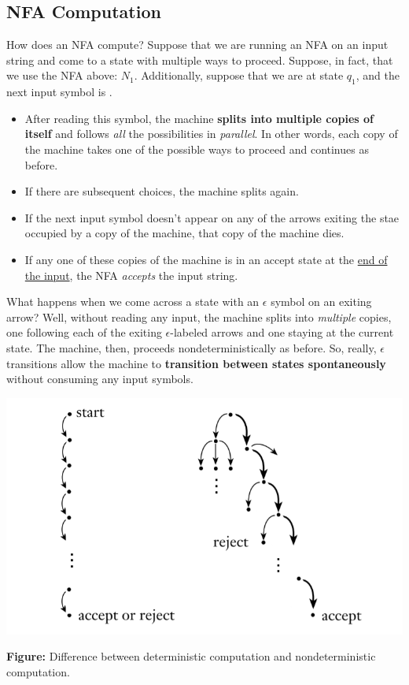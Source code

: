 \documentclass[letterpaper]{article}
\begin{document}
\subsection{NFA Computation}
How does an NFA compute? Suppose that we are running an NFA on an input string and come to a state with multiple ways to proceed. Suppose, in fact, that we use the NFA above: $N_1$. Additionally, suppose that we are at state $q_1$, and the next input symbol is . 
\begin{itemize}
    \item After reading this symbol, the machine \textbf{splits into multiple copies of itself} and follows \emph{all} the possibilities in \emph{parallel}. In other words, each copy of the machine takes one of the possible ways to proceed and continues as before. 
    \item If there are subsequent choices, the machine splits again. 
    \item If the next input symbol doesn't appear on any of the arrows exiting the stae occupied by a copy of the machine, that copy of the machine dies.
    \item If any one of these copies of the machine is in an accept state at the \underline{end of the input}, the NFA \emph{accepts} the input string.
\end{itemize}
What happens when we come across a state with an $\epsilon$ symbol on an exiting arrow? Well, without reading any input, the machine splits into \emph{multiple} copies, one following each of the exiting $\epsilon$-labeled arrows and one staying at the current state. The machine, then, proceeds nondeterministically as before. So, really, $\epsilon$ transitions allow the machine to \textbf{transition between states spontaneously} without consuming any input symbols.

\begin{center}
    \includegraphics[scale=0.4]{assets/nfa_vs_dfa.png}

    \textbf{Figure:} Difference between deterministic computation and nondeterministic computation. 
\end{center}
\end{document}
